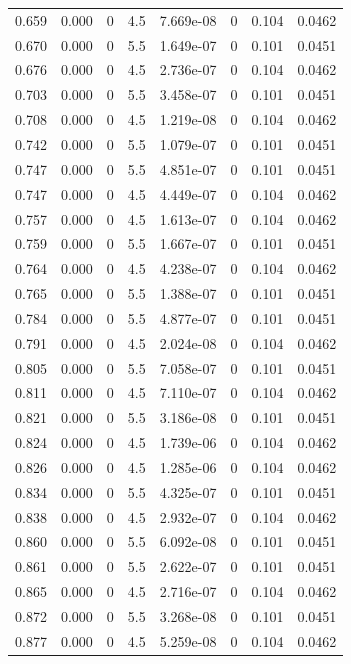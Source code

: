 \documentclass[preview]{standalone}
\begin{document}
{{{\begin{tabular}{L{1.2cm}C{1.2cm} C{0.3cm}C{0.5cm} C{1.4cm}C{1.4cm} C{1.4cm}C{1.4cm}}
  0.659  &  0.000  & 0     & 4.5 &  7.669e-08  & 0  & 0.104 &  0.0462   \\ 
  0.670  &  0.000  & 0     & 5.5 &  1.649e-07  & 0  & 0.101 &  0.0451   \\ 
  0.676  &  0.000  & 0     & 4.5 &  2.736e-07  & 0  & 0.104 &  0.0462   \\ 
  0.703  &  0.000  & 0     & 5.5 &  3.458e-07  & 0  & 0.101 &  0.0451   \\ 
  0.708  &  0.000  & 0     & 4.5 &  1.219e-08  & 0  & 0.104 &  0.0462   \\ 
  0.742  &  0.000  & 0     & 5.5 &  1.079e-07  & 0  & 0.101 &  0.0451   \\ 
  0.747  &  0.000  & 0     & 5.5 &  4.851e-07  & 0  & 0.101 &  0.0451   \\ 
  0.747  &  0.000  & 0     & 4.5 &  4.449e-07  & 0  & 0.104 &  0.0462   \\ 
  0.757  &  0.000  & 0     & 4.5 &  1.613e-07  & 0  & 0.104 &  0.0462   \\ 
  0.759  &  0.000  & 0     & 5.5 &  1.667e-07  & 0  & 0.101 &  0.0451   \\ 
  0.764  &  0.000  & 0     & 4.5 &  4.238e-07  & 0  & 0.104 &  0.0462   \\ 
  0.765  &  0.000  & 0     & 5.5 &  1.388e-07  & 0  & 0.101 &  0.0451   \\ 
  0.784  &  0.000  & 0     & 5.5 &  4.877e-07  & 0  & 0.101 &  0.0451   \\ 
  0.791  &  0.000  & 0     & 4.5 &  2.024e-08  & 0  & 0.104 &  0.0462   \\ 
  0.805  &  0.000  & 0     & 5.5 &  7.058e-07  & 0  & 0.101 &  0.0451   \\ 
  0.811  &  0.000  & 0     & 4.5 &  7.110e-07  & 0  & 0.104 &  0.0462   \\ 
  0.821  &  0.000  & 0     & 5.5 &  3.186e-08  & 0  & 0.101 &  0.0451   \\ 
  0.824  &  0.000  & 0     & 4.5 &  1.739e-06  & 0  & 0.104 &  0.0462   \\ 
  0.826  &  0.000  & 0     & 4.5 &  1.285e-06  & 0  & 0.104 &  0.0462   \\ 
  0.834  &  0.000  & 0     & 5.5 &  4.325e-07  & 0  & 0.101 &  0.0451   \\ 
  0.838  &  0.000  & 0     & 4.5 &  2.932e-07  & 0  & 0.104 &  0.0462   \\ 
  0.860  &  0.000  & 0     & 5.5 &  6.092e-08  & 0  & 0.101 &  0.0451   \\ 
  0.861  &  0.000  & 0     & 5.5 &  2.622e-07  & 0  & 0.101 &  0.0451   \\ 
  0.865  &  0.000  & 0     & 4.5 &  2.716e-07  & 0  & 0.104 &  0.0462   \\ 
  0.872  &  0.000  & 0     & 5.5 &  3.268e-08  & 0  & 0.101 &  0.0451   \\ 
  0.877  &  0.000  & 0     & 4.5 &  5.259e-08  & 0  & 0.104 &  0.0462   \\ 
\hline 
\end{tabular} 

}}}
\end{document}
